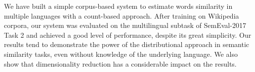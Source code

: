 We have built a simple corpus-based system to estimate words similarity in multiple languages with a count-based approach. After training on Wikipedia corpora, our system was evaluated on the multilingual subtask of SemEval-2017 Task 2 and achieved a good level of performance, despite its great simplicity. Our results tend to demonstrate the power of the distributional approach in semantic similarity tasks, even without knowledge of the underlying language. We also show that dimensionality reduction has a considerable impact on the results.
